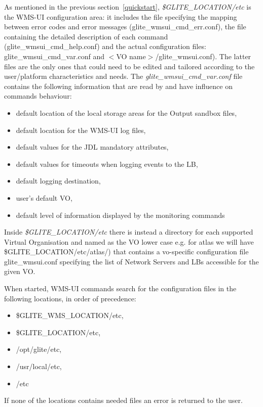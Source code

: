 As mentioned in the previous section~\ref{quickstart}, 
\textit{\$GLITE\_LOCATION/etc} is the WMS-UI configuration area: it includes the file specifying 
the mapping between error codes and error messages (glite\_wmsui\_cmd\_err.conf), 
the file containing the detailed description of each command (glite\_wmsui\_cmd\_help.conf) and the 
actual configuration files: glite\_wmsui\_cmd\_var.conf and $<$VO name$>$/glite\_wmsui.conf). 
The latter files are the only ones that could need to be edited and tailored according to the user/platform 
characteristics and needs. 
The \emph{glite\_wmsui\_cmd\_var.conf } file contains the following information that are read by and have 
influence on commands behaviour: 

\begin{itemize}
\item default location of the local storage areas for the Output sandbox files,
\item default location for the WMS-UI log files,
\item default values for the JDL mandatory attributes,
\item default values for timeouts when logging events to the LB,
\item default logging destination,
\item user's default VO,
\item default level of information displayed by the monitoring commands
\end{itemize}

Inside \textit{\$GLITE\_LOCATION/etc} there is instead a directory for each supported Virtual Organisation and 
named as the VO lower case e.g. for atlas we will have \$GLITE\_LOCATION/etc/atlas/) that contains a vo-specific 
configuration file glite\_wmsui.conf specifying the list of Network Servers and LBs accessible for the given VO.

When started, WMS-UI commands search for the configuration files in the following locations, in order of 
precedence:
 
\begin{itemize}
 \item \$GLITE\_WMS\_LOCATION/etc,
 \item \$GLITE\_LOCATION/etc,  
 \item /opt/glite/etc,
 \item /usr/local/etc,
 \item /etc
\end{itemize}

If none of the locations contains needed files an error is returned to the user.

